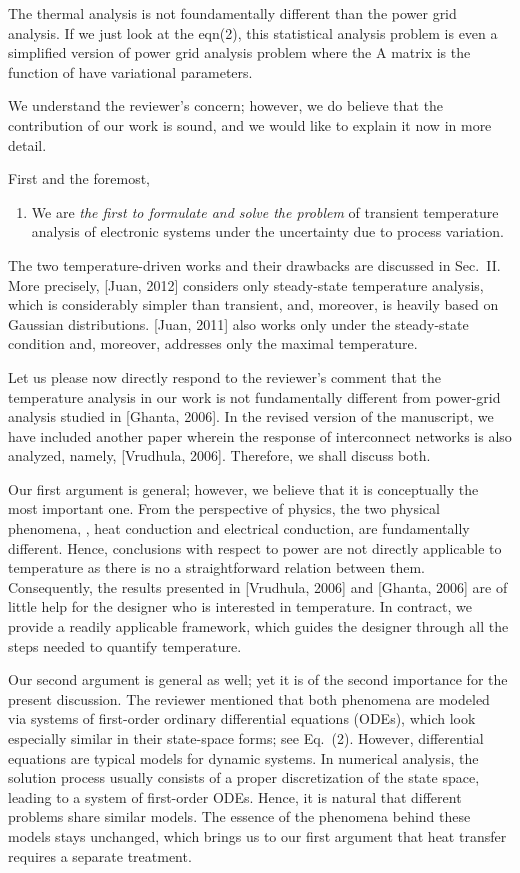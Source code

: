 \begin{reviewer}
The thermal analysis is not foundamentally different than the power grid analysis.  If we just look at the eqn(2), this statistical analysis problem is even a simplified version of power grid analysis problem where the A matrix is the function of have variational parameters.
\end{reviewer}
\begin{authors}
We understand the reviewer's concern; however, we do believe that the contribution of our work is sound, and we would like to explain it now in more detail.

First and the foremost,
\begin{enumerate}
  \item We are \emph{the first to formulate and solve the problem} of transient temperature analysis of electronic systems under the uncertainty due to process variation.
\end{enumerate}
The two temperature-driven works and their drawbacks are discussed in Sec.~II.
More precisely, [Juan, 2012] considers only steady-state temperature analysis, which is considerably simpler than transient, and, moreover, is heavily based on Gaussian distributions.
[Juan, 2011] also works only under the steady-state condition and, moreover, addresses only the maximal temperature.

Let us please now directly respond to the reviewer's comment that the temperature analysis in our work is not fundamentally different from power-grid analysis studied in [Ghanta, 2006].
In the revised version of the manuscript, we have included another paper wherein the response of interconnect networks is also analyzed, namely, [Vrudhula, 2006].
Therefore, we shall discuss both.

Our first argument is general; however, we believe that it is conceptually the most important one.
From the perspective of physics, the two physical phenomena, \ie, heat conduction and electrical conduction, are fundamentally different.
Hence, conclusions with respect to power are not directly applicable to temperature as there is no a straightforward relation between them.
Consequently, the results presented in [Vrudhula, 2006] and [Ghanta, 2006] are of little help for the designer who is interested in temperature.
In contract, we provide a readily applicable framework, which guides the designer through all the steps needed to quantify temperature.

Our second argument is general as well; yet it is of the second importance for the present discussion.
The reviewer mentioned that both phenomena are modeled via systems of first-order ordinary differential equations (ODEs), which look especially similar in their state-space forms; see Eq.~(2).
However, differential equations are typical models for dynamic systems.
In numerical analysis, the solution process usually consists of a proper discretization of the state space, leading to a system of first-order ODEs.
Hence, it is natural that different problems share similar models.
The essence of the phenomena behind these models stays unchanged, which brings us to our first argument that heat transfer requires a separate treatment.


\end{authors}
